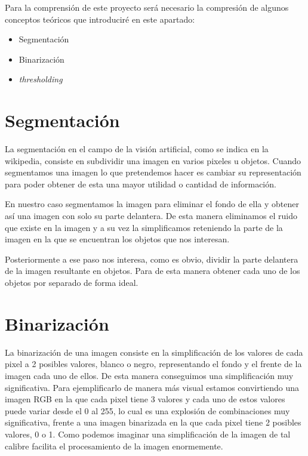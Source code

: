 

Para la comprensión de este proyecto será necesario la compresión de algunos conceptos teóricos que introduciré en este apartado:

\begin{itemize}
	\item Segmentación
	\item Binarización
	\item \textit{thresholding}
\end{itemize}

\section{Segmentación}

La segmentación en el campo de la visión artificial, como se indica en la wikipedia, consiste en subdividir una imagen en varios pixeles u objetos. \cite{wiki:segmentation}
Cuando segmentamos una imagen lo que pretendemos hacer es cambiar su representación para poder obtener de esta una mayor utilidad o cantidad de información.

En nuestro caso segmentamos la imagen para eliminar el fondo de ella y obtener así una imagen con solo su parte delantera. De esta manera eliminamos el ruido que existe en la imagen y a su vez la simplificamos reteniendo la parte de la imagen en la que se encuentran los objetos que nos interesan.

Posteriormente a ese paso nos interesa, como es obvio, dividir la parte delantera de la imagen resultante en objetos. Para de esta manera obtener cada uno de los objetos por separado de forma ideal.
\section{Binarización}

La binarización de una imagen consiste en la simplificación de los valores de cada pixel a 2 posibles valores, blanco o negro, representando el fondo y el frente de la imagen cada uno de ellos. De esta manera conseguimos una simplificación muy significativa. Para ejemplificarlo de manera más visual estamos convirtiendo una imagen RGB en la que cada pixel tiene 3 valores y cada uno de estos valores puede variar desde el 0 al 255, lo cual es una explosión de combinaciones muy significativa, frente a una imagen binarizada en la que cada pixel tiene 2 posibles valores, 0 o 1. Como podemos imaginar una simplificación de la imagen de tal calibre facilita el procesamiento de la imagen enormemente.

